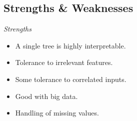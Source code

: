 \documentclass[english,nohyper,titlepage]{tufte-handout}\usepackage{knitr}
\begin{document}
\subsection{Strengths \& Weaknesses}

\emph{Strengths}
\begin{itemize}
  \item A single tree is highly interpretable.
  \item Tolerance to irrelevant features.
  \item Some tolerance to correlated inputs.
  \item Good with big data.
  \item Handling of missing values.
\end{itemize}

\end{document}
